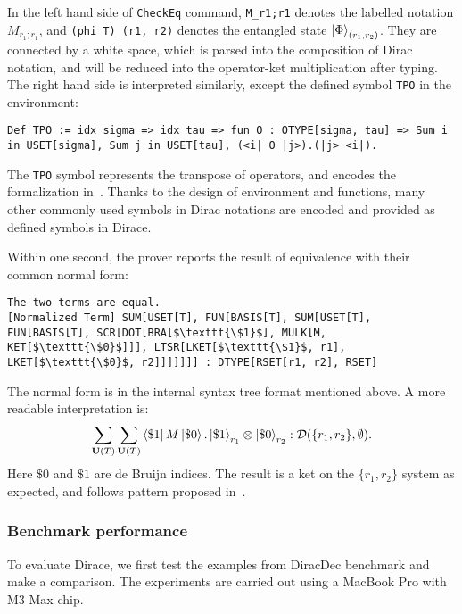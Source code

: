 \documentclass[runningheads]{llncs}
\begin{document}
In the left hand side of \texttt{\textcolor{NavyBlue}{CheckEq}} command, \texttt{M\_r1;r1} denotes the labelled notation $M_{r_1; r_1}$, and \texttt{(phi T)\_(r1, r2)} denotes the entangled state $\ket{\Phi}_{(r_1, r_2)}$. They are connected by a white space, which is parsed into the composition of Dirac notation, and will be reduced into the operator-ket multiplication after typing. The right hand side is interpreted similarly, except the defined symbol \texttt{TPO} in the environment:

\begin{lstlisting}[style=dirace]
Def TPO := idx sigma => idx tau => fun O : OTYPE[sigma, tau] => Sum i in USET[sigma], Sum j in USET[tau], (<i| O |j>).(|j> <i|).
\end{lstlisting}

The \texttt{TPO} symbol represents the transpose of operators, and encodes the formalization in~. Thanks to the design of environment and functions, many other commonly used symbols in Dirac notations are encoded and provided as defined symbols in Dirace.

Within one second, the prover reports the result of equivalence with their common normal form:
    \begin{lstlisting}[style=dirace]
The two terms are equal.
[Normalized Term] SUM[USET[T], FUN[BASIS[T], SUM[USET[T], FUN[BASIS[T], SCR[DOT[BRA[$\texttt{\$1}$], MULK[M, KET[$\texttt{\$0}$]]], LTSR[LKET[$\texttt{\$1}$, r1], LKET[$\texttt{\$0}$, r2]]]]]]] : DTYPE[RSET[r1, r2], RSET]
    \end{lstlisting}

The normal form is in the internal syntax tree format mentioned above. A more readable interpretation is:
\[
\sum_{\mathbf{U}(T)} \sum_{\mathbf{U}(T)} \bra{\$1}M\ket{\$ 0} . \ket{\$1}_{r_1} \otimes \ket{\$0}_{r_2} : \mathcal{D}(\{r_1, r_2\}, \emptyset).
\]
Here $\$0$ and $\$1$ are de Bruijn indices. The result is a ket on the $\{r_1, r_2\}$ system as expected, and follows pattern proposed in~.




\subsubsection{Benchmark performance}

To evaluate Dirace, we first test the examples from DiracDec benchmark and make a comparison.
The experiments are carried out using a MacBook Pro with M3 Max chip.
\end{document}
